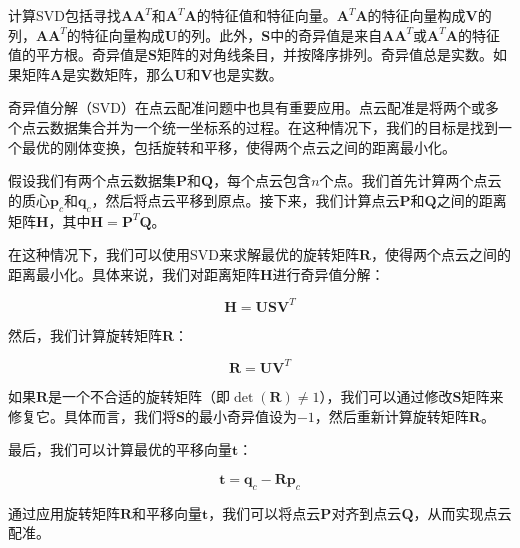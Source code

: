 计算SVD包括寻找$\boldsymbol{A} \boldsymbol{A}^T$和$\boldsymbol{A}^T \boldsymbol{A}$的特征值和特征向量。$\boldsymbol{A}^T \boldsymbol{A}$的特征向量构成$\boldsymbol{V}$的列，$\boldsymbol{A} \boldsymbol{A}^T$的特征向量构成$\boldsymbol{U}$的列。此外，$\boldsymbol{S}$中的奇异值是来自$\boldsymbol{A} \boldsymbol{A}^T$或$\boldsymbol{A}^T \boldsymbol{A}$的特征值的平方根。奇异值是$\boldsymbol{S}$矩阵的对角线条目，并按降序排列。奇异值总是实数。如果矩阵$\boldsymbol{A}$是实数矩阵，那么$\boldsymbol{U}$和$\boldsymbol{V}$也是实数。

奇异值分解（SVD）在点云配准问题中也具有重要应用。点云配准是将两个或多个点云数据集合并为一个统一坐标系的过程。在这种情况下，我们的目标是找到一个最优的刚体变换，包括旋转和平移，使得两个点云之间的距离最小化。

假设我们有两个点云数据集$\boldsymbol{P}$和$\boldsymbol{Q}$，每个点云包含$n$个点。我们首先计算两个点云的质心$\boldsymbol{p}_c$和$\boldsymbol{q}_c$，然后将点云平移到原点。接下来，我们计算点云$\boldsymbol{P}$和$\boldsymbol{Q}$之间的距离矩阵$\boldsymbol{H}$，其中$\boldsymbol{H}=\boldsymbol{P}^T\boldsymbol{Q}$。

在这种情况下，我们可以使用SVD来求解最优的旋转矩阵$\boldsymbol{R}$，使得两个点云之间的距离最小化。具体来说，我们对距离矩阵$\boldsymbol{H}$进行奇异值分解：

\begin{equation}
\boldsymbol{H} = \boldsymbol{U} \boldsymbol{S} \boldsymbol{V}^T
\end{equation}

然后，我们计算旋转矩阵$\boldsymbol{R}$：

\begin{equation}
\boldsymbol{R} = \boldsymbol{U} \boldsymbol{V}^T
\end{equation}

如果$\boldsymbol{R}$是一个不合适的旋转矩阵（即$\det(\boldsymbol{R})\neq 1$），我们可以通过修改$\boldsymbol{S}$矩阵来修复它。具体而言，我们将$\boldsymbol{S}$的最小奇异值设为$-1$，然后重新计算旋转矩阵$\boldsymbol{R}$。

最后，我们可以计算最优的平移向量$\boldsymbol{t}$：

\begin{equation}
\boldsymbol{t} = \boldsymbol{q}_c - \boldsymbol{R} \boldsymbol{p}_c
\end{equation}

通过应用旋转矩阵$\boldsymbol{R}$和平移向量$\boldsymbol{t}$，我们可以将点云$\boldsymbol{P}$对齐到点云$\boldsymbol{Q}$，从而实现点云配准。

